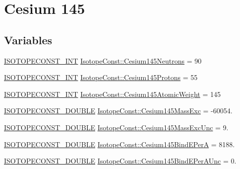 \hypertarget{group___isotope_const-_cesium-_cs145}{}\section{Cesium 145}
\label{group___isotope_const-_cesium-_cs145}
\subsection*{Variables}
\begin{DoxyCompactItemize}
\item 
\mbox{\hyperlink{group___isotope_const-_macros_ga5f18360b3e99483a35c32d789e62621c}{I\+S\+O\+T\+O\+P\+E\+C\+O\+N\+S\+T\+\_\+\+I\+NT}} \mbox{\hyperlink{group___isotope_const-_cesium-_cs145_gad6cd01399b113ce5a4dc2343e1cacf05}{Isotope\+Const\+::\+Cesium145\+Neutrons}} = 90
\item 
\mbox{\hyperlink{group___isotope_const-_macros_ga5f18360b3e99483a35c32d789e62621c}{I\+S\+O\+T\+O\+P\+E\+C\+O\+N\+S\+T\+\_\+\+I\+NT}} \mbox{\hyperlink{group___isotope_const-_cesium-_cs145_ga8252e6960e2fda17f19b3730e5b79636}{Isotope\+Const\+::\+Cesium145\+Protons}} = 55
\item 
\mbox{\hyperlink{group___isotope_const-_macros_ga5f18360b3e99483a35c32d789e62621c}{I\+S\+O\+T\+O\+P\+E\+C\+O\+N\+S\+T\+\_\+\+I\+NT}} \mbox{\hyperlink{group___isotope_const-_cesium-_cs145_ga3c8600741d06a92a66577312878e33ef}{Isotope\+Const\+::\+Cesium145\+Atomic\+Weight}} = 145
\item 
\mbox{\hyperlink{group___isotope_const-_macros_ga8f45a7272ce02c0b4c65c44636ed719a}{I\+S\+O\+T\+O\+P\+E\+C\+O\+N\+S\+T\+\_\+\+D\+O\+U\+B\+LE}} \mbox{\hyperlink{group___isotope_const-_cesium-_cs145_ga2bc3509a0ed6ce4ace24a7cb9e974b67}{Isotope\+Const\+::\+Cesium145\+Mass\+Exc}} = -\/60054.
\item 
\mbox{\hyperlink{group___isotope_const-_macros_ga8f45a7272ce02c0b4c65c44636ed719a}{I\+S\+O\+T\+O\+P\+E\+C\+O\+N\+S\+T\+\_\+\+D\+O\+U\+B\+LE}} \mbox{\hyperlink{group___isotope_const-_cesium-_cs145_ga30ac31dbe26d5edade16e2656e73e1bf}{Isotope\+Const\+::\+Cesium145\+Mass\+Exc\+Unc}} = 9.
\item 
\mbox{\hyperlink{group___isotope_const-_macros_ga8f45a7272ce02c0b4c65c44636ed719a}{I\+S\+O\+T\+O\+P\+E\+C\+O\+N\+S\+T\+\_\+\+D\+O\+U\+B\+LE}} \mbox{\hyperlink{group___isotope_const-_cesium-_cs145_ga74b471647e3d94e7dc9a8298768090d4}{Isotope\+Const\+::\+Cesium145\+Bind\+E\+PerA}} = 8188.
\item 
\mbox{\hyperlink{group___isotope_const-_macros_ga8f45a7272ce02c0b4c65c44636ed719a}{I\+S\+O\+T\+O\+P\+E\+C\+O\+N\+S\+T\+\_\+\+D\+O\+U\+B\+LE}} \mbox{\hyperlink{group___isotope_const-_cesium-_cs145_ga0a52384650414f2c68574f0dc0f0ae59}{Isotope\+Const\+::\+Cesium145\+Bind\+E\+Per\+A\+Unc}} = 0.

\end{DoxyCompactItemize}
